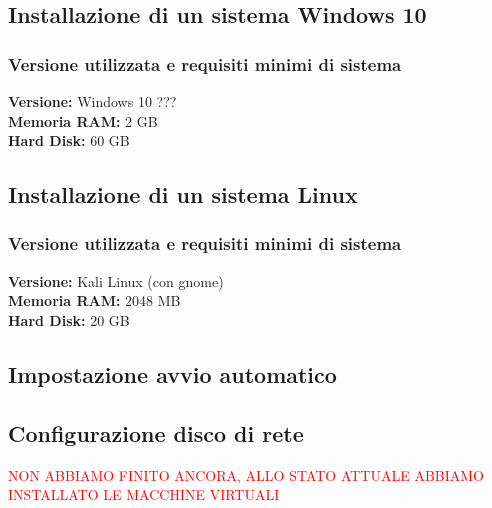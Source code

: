 \documentclass{article}
\begin{document}
\subsection{Installazione di un sistema Windows 10}
\subsubsection{Versione utilizzata e requisiti minimi di sistema}
\textbf{Versione:} Windows 10 ???\\
\textbf{Memoria RAM:} 2 GB \\
\textbf{Hard Disk:} 60 GB

\subsection{Installazione di un sistema Linux}
\subsubsection{Versione utilizzata e requisiti minimi di sistema}
\textbf{Versione:} Kali Linux (con gnome) \\
\textbf{Memoria RAM:} 2048 MB \\
\textbf{Hard Disk:} 20 GB

\subsection{Impostazione avvio automatico}

\subsection{Configurazione disco di rete}

\textcolor{red}{NON ABBIAMO FINITO ANCORA, ALLO STATO ATTUALE ABBIAMO INSTALLATO LE MACCHINE VIRTUALI}
\end{document}
